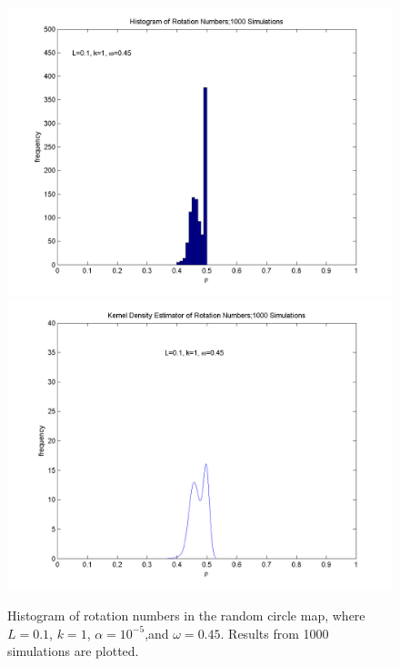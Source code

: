 \begin{figure}[H]\linespread{1}
\caption[Histogram of rotation numbers in the random circle
map]{Histogram of rotation numbers in the random circle map, where
  $L=0.1$, $k=1$, $\alpha = 10^{-5}$,and $\omega = 0.45$. Results from 1000 simulations
  are plotted.}
\centering
\includegraphics[width=.5\textwidth]{figs/hist_rho_k1_L01_om045.png}\hfill
\includegraphics[width=.5\textwidth]{figs/kde_rho_k1_L01_om045.png}
\end{figure}

